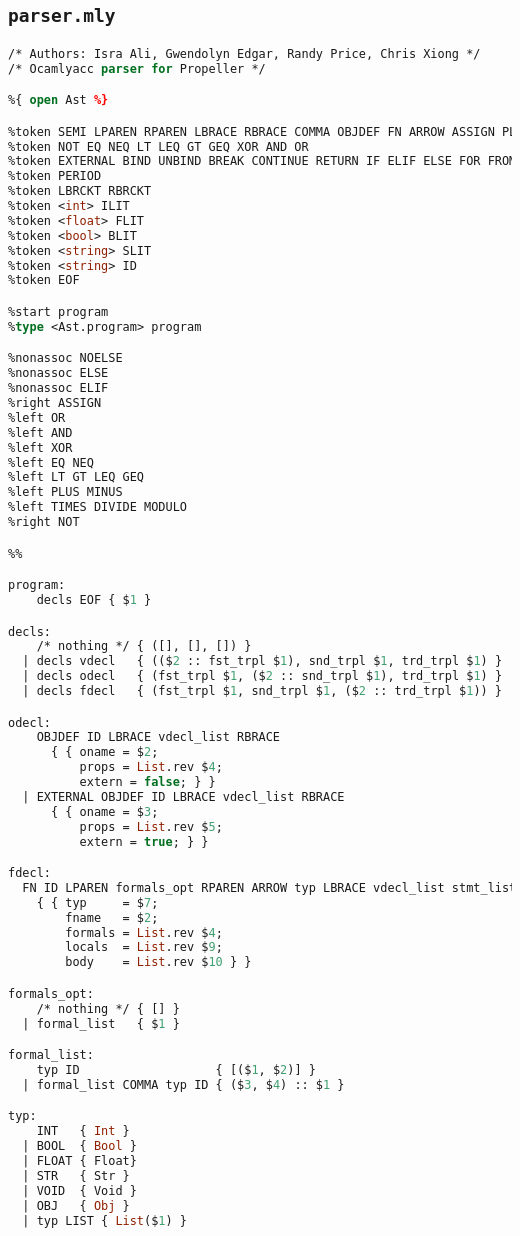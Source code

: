 \subsection{\texttt{parser.mly}}

\begin{lstlisting}[language=Caml,backgroundcolor=\color{backgroundcolor}]
/* Authors: Isra Ali, Gwendolyn Edgar, Randy Price, Chris Xiong */
/* Ocamlyacc parser for Propeller */

%{ open Ast %}

%token SEMI LPAREN RPAREN LBRACE RBRACE COMMA OBJDEF FN ARROW ASSIGN PLUS MINUS TIMES DIVIDE MODULO
%token NOT EQ NEQ LT LEQ GT GEQ XOR AND OR
%token EXTERNAL BIND UNBIND BREAK CONTINUE RETURN IF ELIF ELSE FOR FROM TO WHILE OBJ INT BOOL FLOAT STR VOID LIST
%token PERIOD
%token LBRCKT RBRCKT
%token <int> ILIT
%token <float> FLIT
%token <bool> BLIT
%token <string> SLIT
%token <string> ID
%token EOF

%start program
%type <Ast.program> program

%nonassoc NOELSE
%nonassoc ELSE
%nonassoc ELIF
%right ASSIGN
%left OR
%left AND
%left XOR
%left EQ NEQ
%left LT GT LEQ GEQ
%left PLUS MINUS
%left TIMES DIVIDE MODULO
%right NOT

%%

program:
    decls EOF { $1 }

decls:
    /* nothing */ { ([], [], []) }
  | decls vdecl   { (($2 :: fst_trpl $1), snd_trpl $1, trd_trpl $1) }
  | decls odecl   { (fst_trpl $1, ($2 :: snd_trpl $1), trd_trpl $1) }
  | decls fdecl   { (fst_trpl $1, snd_trpl $1, ($2 :: trd_trpl $1)) }

odecl:
    OBJDEF ID LBRACE vdecl_list RBRACE
      { { oname = $2;
          props = List.rev $4;
          extern = false; } }
  | EXTERNAL OBJDEF ID LBRACE vdecl_list RBRACE
      { { oname = $3;
          props = List.rev $5;
          extern = true; } }

fdecl:
  FN ID LPAREN formals_opt RPAREN ARROW typ LBRACE vdecl_list stmt_list RBRACE
    { { typ     = $7;
        fname   = $2;
        formals = List.rev $4;
        locals  = List.rev $9;
        body    = List.rev $10 } }

formals_opt:
    /* nothing */ { [] }
  | formal_list   { $1 }

formal_list:
    typ ID                   { [($1, $2)] }
  | formal_list COMMA typ ID { ($3, $4) :: $1 }

typ:
    INT   { Int }
  | BOOL  { Bool }
  | FLOAT { Float}
  | STR   { Str }
  | VOID  { Void }
  | OBJ   { Obj }
  | typ LIST { List($1) }


\end{lstlisting}
